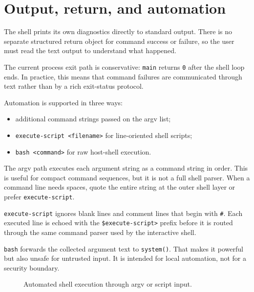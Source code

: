 \section{Output, return, and automation}
\label{sec:shell-output-automation}

The shell prints its own diagnostics directly to standard output. There is no
separate structured return object for command success or failure, so the user
must read the text output to understand what happened.

The current process exit path is conservative: \texttt{main} returns \texttt{0}
after the shell loop ends. In practice, this means that command failures are
communicated through text rather than by a rich exit-status protocol.

Automation is supported in three ways:
\begin{itemize}
\item additional command strings passed on the argv list;
\item \texttt{execute-script <filename>} for line-oriented shell scripts;
\item \texttt{bash <command>} for raw host-shell execution.
\end{itemize}

The argv path executes each argument string as a command string in order. This
is useful for compact command sequences, but it is not a full shell parser.
When a command line needs spaces, quote the entire string at the outer shell
layer or prefer \texttt{execute-script}.

\texttt{execute-script} ignores blank lines and comment lines that begin with
\texttt{\#}. Each executed line is echoed with the \texttt{\$execute-script>}
prefix before it is routed through the same command parser used by the
interactive shell.

\texttt{bash} forwards the collected argument text to \texttt{system()}. That
makes it powerful but also unsafe for untrusted input. It is intended for local
automation, not for a security boundary.

\begin{figure}[htbp]
\centering
\caption{Automated shell execution through argv or script input.}
\label{fig:shell-automation}
\end{figure}

